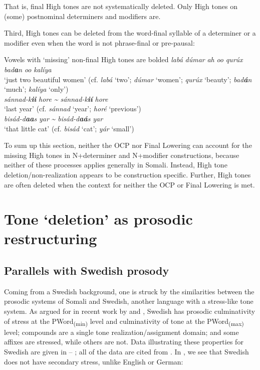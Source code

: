 \documentclass[output=paper]{langscibook}
\begin{document}
That is, final High tones are not systematically deleted. Only High tones on (some) postnominal determiners and modifiers are.

Third, High tones can be deleted from the word-final syllable of a determiner or a modifier even when the word is not phrase-final or pre-pausal:


\ea Vowels with ‘missing’ non-final High tones are bolded \label{ex:downing:12}
\ea  \textit{labá} \textit{dúmar} \textit{ah} \textit{oo} \textit{qurúx} \textit{bad}\textbf{\textit{a}}\textit{n} \textit{oo} \textit{kalíya} \\
  ‘just two beautiful women’ (cf. \textit{labá} ‘two’; \textit{dúmar} ‘women’;   \textit{qurúx} ‘beauty’; \textit{bad}\textbf{\textit{á}}\textit{n} ‘much’; \textit{kalíya} ‘only’)\\
\ex   \textit{sánnad-k}\textbf{\textit{ii}} \textit{hore} \textit{{\textasciitilde} sánnad-k}\textbf{\textit{ií}} \textit{hore} \\
  ‘last year’ (cf. \textit{sánnad} ‘year’; \textit{horé} ‘previous’)\\
\ex   \textit{bisád-d}\textbf{\textit{aa}}\textit{s} \textit{yar} \textit{{\textasciitilde} bisád-d}\textbf{\textit{aá}}\textit{s} \textit{yar} \\
  ‘that little cat’ (cf. \textit{bisád} ‘cat’; \textit{yár} ‘small’)\\
\z
\z

To sum up this section, neither the OCP nor Final Lowering can account for the missing High tones in N+determiner and N+modifier constructions, because neither of these processes applies generally in Somali. Instead, High tone deletion\slash non-realization appears to be construction specific. Further, High tones are often deleted when the context for neither the OCP or Final Lowering is met.


\section{Tone ‘deletion’ as prosodic restructuring}
\label{sec:downing:4}

\subsection{Parallels with Swedish prosody}


Coming from a Swedish background, one is struck by the similarities between the prosodic systems of Somali and Swedish, another language with a stress-like tone system. As argued for in recent work by \citet{Riad2012, Riad2016} and \citet{Myrberg2015}, Swedish has prosodic culminativity of stress at the PWord\textsubscript{(min)} level and culminativity of tone at the PWord\textsubscript{(max)} level; compounds are a single tone realization\slash assignment domain; and some affixes are stressed, while others are not. Data illustrating these properties for Swedish are given in  – ; all of the data are cited from \citet{Myrberg2015}. In , we see that Swedish does not have secondary stress, unlike English or German:
\end{document}
